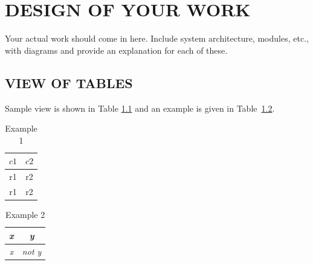 
\chapter{\uppercase{Design of your work}} %
\label{ch:chap3} %
Your actual work should come in here. Include system architecture, modules, etc., with diagrams and provide an explanation for each of these.  
\section{\uppercase{View of Tables}}
Sample view  is shown in Table \ref{tab:first} and an example is given in Table~\ref{tab:second}.
\begin{table}[h]
\caption{Example 1}
\begin{center}
\begin{tabular}{|c|c|}
\hline
$c1$ & $c2$ \\
\hline
r1 & r2 \\
\hline
r1  & r2 \\
\hline
\end{tabular}
\end{center}
\label{tab:first}
\end{table}
\begin{table}[h]
\caption{Example 2}
\begin{center}
\begin{tabular}{|c|c|}
\hline
\textit{x} & \textit{y}  \\
\hline
\textit{x} & \textit{not y}  \\
\hline
\end{tabular}
\end{center}
\label{tab:second}
\end{table}

